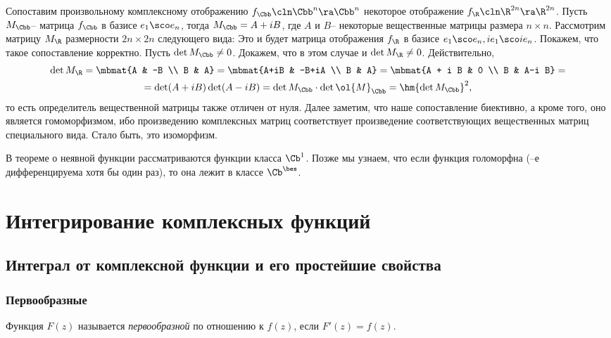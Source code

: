 \documentclass[a4paper]{article}
\begin{document}
Сопоставим произвольному комплексному отображению $f_\Cbb\cln \Cbb^n\ra\Cbb^n$ некоторое отображение $f_\R\cln \R^{2n}\ra\R^{2n}$.
Пусть $M_\Cbb$-- матрица $f_\Cbb$ в базисе $e_1 \sco e_n$, тогда $M_\Cbb = A+iB$, где $A$ и $B$--
некоторые вещественные матрицы размера $n\times n$. Рассмотрим матрицу $M_\R$ размерности $2n\times 2n$ следующего вида:
Это и будет матрица отображения $f_\R$ в базисе $e_1 \sco e_n, i e_1 \sco i e_n$. Покажем, что такое
сопоставление корректно. Пусть $\det M_\Cbb \neq 0$. Докажем, что в этом случае и $\det M_\R\neq 0$. Действительно,
\begin{multline}
\det M_\R = \mbmat{A & -B \\ B & A} = \mbmat{A+iB & -B+iA \\ B & A} = \mbmat{A + i B & 0 \\  B &  A-i B} =\\
=\det(A+iB)\det(A-i B)= \det M_\Cbb \cdot \det \ol{M}_\Cbb  = \hm{\det M_\Cbb}^2,
\end{multline}
то есть определитель вещественной матрицы также отличен от нуля. Далее заметим, что наше сопоставление
биективно, а кроме того, оно является гомоморфизмом, ибо произведению комплексных матриц соответствует
произведение соответствующих вещественных матриц специального вида. Стало быть, это изоморфизм.

\begin{note}
В теореме о неявной функции рассматриваются функции класса $\Cb^1$. Позже мы узнаем, что если функция
голоморфна (--е дифференцируема хотя бы один раз), то она лежит в классе $\Cb^\bes$.
\end{note}

\section{Интегрирование комплексных функций}

\subsection{Интеграл от комплексной функции и его простейшие свойства}

\subsubsection{Первообразные}

\begin{df}
Функция $F(z)$ называется \emph{первообразной} по отношению к $f(z)$, если $F'(z)=f(z)$.
\end{df}
\end{document}
